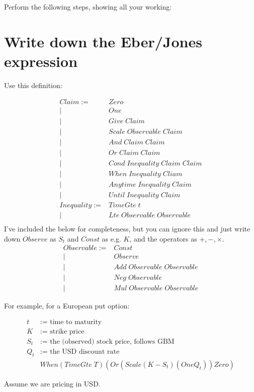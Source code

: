 \documentclass[a4paper]{article}
\begin{document}
Perform the following steps, showing all your working:

\section{Write down the Eber/Jones expression}

Use this definition:

\begin{align*}
Claim := & Zero \\
|& One \\
|& Give \; Claim \\
|& Scale \; Observable \; Claim \\
|& And \; Claim \; Claim \\
|& Or \; Claim \; Claim \\
|& Cond \; Inequality \; Claim \; Claim \\
|& When \; Inequality \; Cliam \\
|& Anytime \; Inequality \; Claim \\
|& Until \; Inequality \; Claim \\
Inequality := & TimeGte \; t \\
| & Lte \; Observable \; Observable \\
\end{align*}
I've included the below for completeness, but you can ignore this and just write down $Observe$ as $S_t$ and $Const$ as e.g. $K$, and the operators as $+, -, \times$.
\begin{align*}
Observable := & Const \\
| & Observe \\
| & Add \; Observable \; Observable \\
| & Neg \; Observable \\
| & Mul \; Observable \; Observable
\end{align*}


For example, for a European put option:

\begin{align*}
  t &:= \text{ time to maturity} \\
  K &:= \text{ strike price} \\
  S_t &:= \text{ the (observed) stock price, follows GBM} \\
  Q_t & := \text{ the USD discount rate } \\
  & When (TimeGte \; T) (Or (Scale (K - S_t) (One Q_t)) Zero)
\end{align*}


Assume we are pricing in USD.
\end{document}
